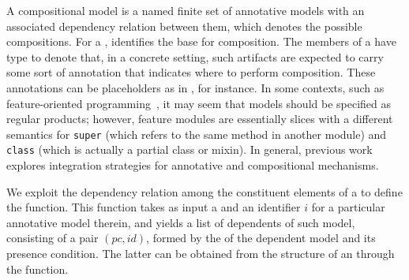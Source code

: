 A compositional model is a named finite set of annotative models with an associated dependency relation between them, which denotes the possible compositions.
For a  ,  identifies the base for composition.
%
The members of a  have type  to denote that, in a concrete setting, such artifacts are expected to carry some sort of annotation that indicates where to perform composition.
These annotations can be placeholders as in , for instance.
In some contexts, such as feature-oriented programming~\cite{fop}, it may seem that models should be specified as regular products; however, feature modules are essentially slices with a different semantics for \texttt{super} (which refers to the same method in another module) and \texttt{class} (which is actually a partial class or mixin).
In general, previous work~\cite{gamaLJ} explores integration strategies for annotative and compositional mechanisms. 


We exploit the dependency relation among the constituent elements of a  to define the  function. This function takes as input a  and an identifier $i$ for a particular annotative model therein, and yields a list of dependents of such model, consisting of a pair $(pc,id)$, formed by the  of the dependent model and its presence condition.
The latter can be obtained from the structure of an  through the  function. 

